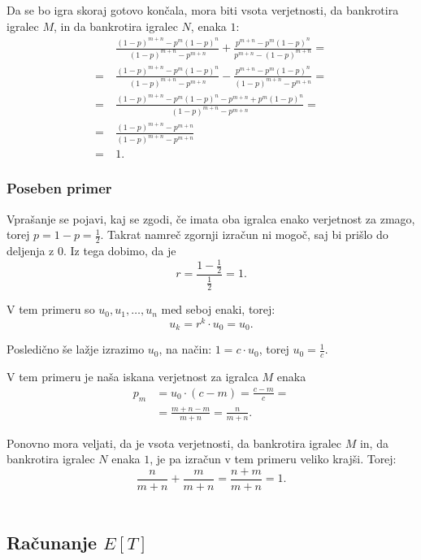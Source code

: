 \documentclass[12pt, a4paper]{article}
\begin{document}
Da se bo igra skoraj gotovo končala, mora biti vsota verjetnosti, da bankrotira igralec $M$, in da bankrotira igralec $N$, enaka $1$:
\begin{equation*}
\begin{split}
&~\frac{(1-p)^{m+n}-p^m (1-p)^n}{(1-p)^{m+n}-p^{m+n}}+\frac{p^{m+n}-p^m
   (1-p)^n}{p^{m+n}-(1-p)^{m+n}} =\\
= &~\frac{(1-p)^{m+n}-p^m (1-p)^n}{(1-p)^{m+n}-p^{m+n}}-\frac{p^{m+n}-p^m
   (1-p)^n}{(1-p)^{m+n}-p^{m+n}} =\\
= &~\frac{(1-p)^{m+n}-p^m (1-p)^n-p^{m+n}+p^m
   (1-p)^n}{(1-p)^{m+n}-p^{m+n}} =\\
= &~\frac{(1-p)^{m+n}-p^{m+n}}{(1-p)^{m+n}-p^{m+n}} \\
= &~1.
\end{split} 
\end{equation*}


\subsubsection{Poseben primer}
\label{Posebni primer za  r = 1}
Vprašanje se pojavi, kaj se zgodi, če imata oba igralca enako verjetnost za zmago, torej $p = 1 - p = \frac{1}{2}$. Takrat namreč zgornji izračun ni mogoč, saj bi prišlo do deljenja z $0$. Iz tega dobimo, da je 
$$r = \frac{1 - \frac{1}{2}}{\frac{1}{2}} = 1.$$

V tem primeru so $u_0, u_1, \dotso, u_n$ med seboj enaki, torej:
$$u_k = r^k \cdot u_0 = u_0.$$

Posledično še lažje izrazimo $u_0$, na način:
$1 = c\cdot u_0$, torej $u_0 = \frac{1}{c}.$

V tem primeru je naša iskana verjetnost za igralca $M$ enaka
\begin{equation*}
\begin{split}
p_m &= u_0 \cdot (c - m) = \frac{c-m}{c} = \\
		&= \frac{m + n - m}{m + n} = \frac{n}{m + n}.
\end{split} 
\end{equation*}

Ponovno mora veljati, da je vsota verjetnosti, da bankrotira igralec $M$ in, da bankrotira igralec $N$ enaka $1$, je pa izračun v tem primeru veliko krajši. Torej: 
$$\frac{n}{m + n} + \frac{m}{m + n} = \frac{n + m}{m+ n} = 1.$$
\\


\subsection{Računanje $E[T]$}
\end{document}
